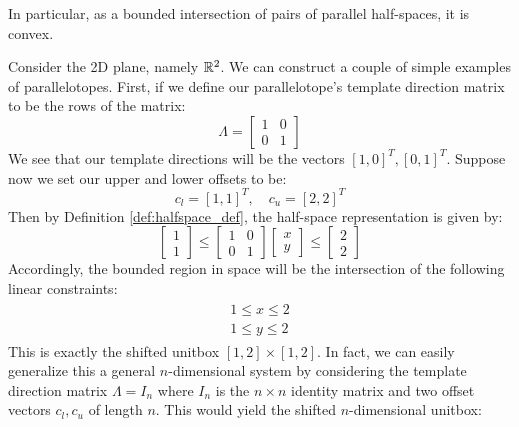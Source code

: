 %
\noindent In particular, as a bounded intersection of pairs of parallel half-spaces, it is convex.
%
\begin{example}
\label{ex:simple_ptope}
Consider the 2D plane, namely ${\mathbb{R}}^2$. We can construct a couple of simple examples of parallelotopes. First, if we define our parallelotope's template direction matrix to be the rows of the matrix:
%
\begin{equation}
  \Lambda = \begin{bmatrix} 1 & 0 \\ 0 & 1 \end{bmatrix}
\end{equation}
%
We see that our template directions will be the vectors $[1,0]^T, [0,1]^T$. Suppose now we set our upper and lower offsets to be:
%
\begin{equation}
  c_l = [1,1]^T, \quad c_u = [2,2]^T
\end{equation}
Then by Definition \ref{def:halfspace_def}, the half-space representation is given by:
\begin{equation}
\begin{bmatrix}
  1 \\ 1
\end{bmatrix} \leq \begin{bmatrix}
    1 & 0 \\ 0 & 1
  \end{bmatrix}\begin{bmatrix}
   x \\ y
  \end{bmatrix} \leq \begin{bmatrix}
    2 \\ 2
  \end{bmatrix}
\end{equation}
%
Accordingly, the bounded region in space will be the intersection of the following linear constraints:
%
\begin{align}
  \begin{split}
  1 \leq x \leq 2 \\
  1 \leq y \leq 2
  \end{split}
\end{align}
This is exactly the shifted unitbox $[1,2] \times [1,2]$. In fact, we can easily generalize this a general $n$-dimensional system by considering the template direction matrix $\Lambda = I_n$ where $I_n$ is the $n \times n$ identity matrix and two offset vectors $c_l, c_u$ of length $n$. This would yield the shifted $n$-dimensional unitbox:


\end{example}
